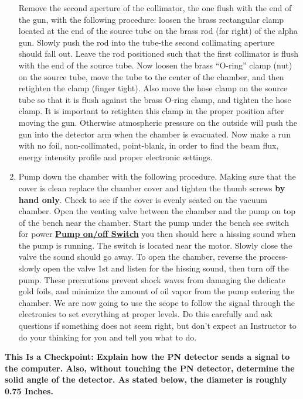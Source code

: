\documentclass{../lab}
\begin{document}
\begin{enumerate}
    Remove the second aperture of the collimator, the one flush with the end of the gun, with the following procedure: loosen the brass rectangular clamp located at the end of the source tube on the brass rod (far right) of the alpha gun. Slowly push the rod into the tube-the second collimating aperture should fall out. Leave the rod positioned such that the first collimator is flush with the end of the source tube. Now loosen the brass ``O-ring'' clamp (nut) on the source tube, move the tube to the center of the chamber, and then retighten the clamp (finger tight). Also move the hose clamp on the source tube so that it is flush against the brass O-ring clamp, and tighten the hose clamp. It is important to retighten this clamp in the proper position after moving the gun. Otherwise atmospheric pressure on the outside will push the gun into the detector arm when the chamber is evacuated. Now make a run with no foil, non-collimated, point-blank, in order to find the beam flux, energy intensity profile and proper electronic settings.

    \item Pump down the chamber with the following procedure. Making sure that the cover is clean replace the chamber cover and tighten the thumb screws \textbf{by hand only}. Check to see if the cover is evenly seated on the vacuum chamber. Open the venting valve between the chamber and the pump on top of the bench near the chamber. Start the pump under the bench see switch for power \href{http://experimentationlab.berkeley.edu/sites/default/files/images/Pump\_Switch\_3535.jpg}{\textbf{Pump on/off Switch}} you then should here a hissing sound when the pump is running. The switch is located near the motor. Slowly close the valve the sound should go away. To open the chamber, reverse the process-slowly open the valve 1st and listen for the hissing sound, then turn off the pump. These precautions prevent shock waves from damaging the delicate gold foils, and minimize the amount of oil vapor from the pump entering the chamber. We are now going to use the scope to follow the signal through the electronics to set everything at proper levels. Do this carefully and ask questions if something does not seem right, but don't expect an Instructor to do your thinking for you and tell you what to do.

\end{enumerate}

\textbf{This Is a Checkpoint: Explain how the PN detector sends a signal to the computer. Also, without touching the PN detector, determine the solid angle of the detector. As stated below, the diameter is roughly 0.75 Inches. }
\end{document}
